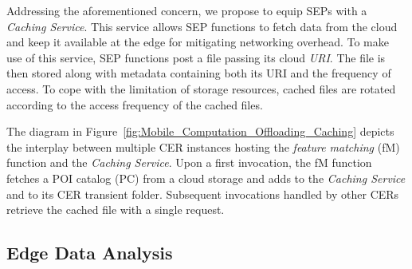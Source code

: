 Addressing the aforementioned concern, we propose to equip SEPs with a \textit{Caching Service}. This service allows SEP functions to fetch data from the cloud and keep it available at the edge for mitigating networking overhead. 
To make use of this service, SEP functions post a file passing its cloud \textit{URI}.
The file is then stored along with metadata containing both its URI and the frequency of access. %
To cope with the limitation of storage resources, cached files are rotated according to the access frequency of the cached files. %

The diagram in Figure~\ref{fig:Mobile_Computation_Offloading_Caching} depicts the interplay between multiple CER instances hosting the \textit{feature matching} (fM) function and the \textit{Caching Service}. Upon a first invocation, the fM function fetches a POI catalog (PC) from a cloud storage and adds to the \textit{Caching Service} and to its CER transient folder. Subsequent invocations handled by other CERs retrieve the cached file with a single request.


\subsection{Edge Data Analysis}\label{sec:SEP_EDA}

